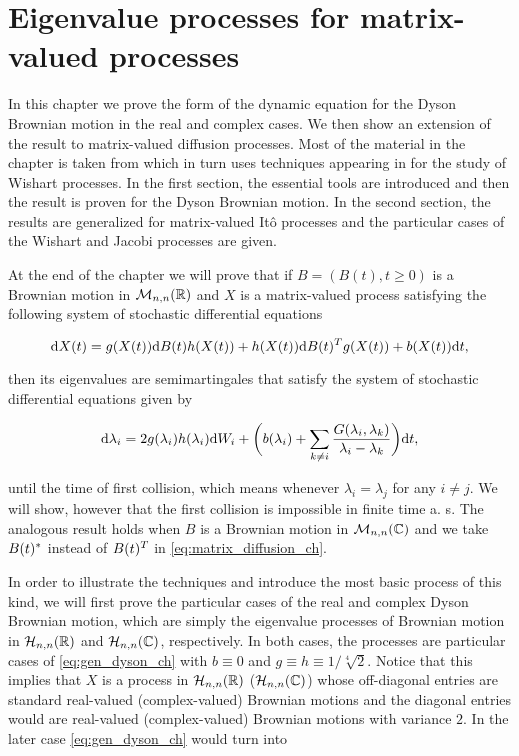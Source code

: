 \chapter{Eigenvalue processes for matrix-valued processes}  \label{ch:eigen_processes}

In this chapter we prove the form of the dynamic equation for the Dyson Brownian motion in the real and complex cases. We then show an extension of the result to matrix-valued diffusion processes. Most of the material in the chapter is taken from \cite{article:multiyamada} which in turn uses techniques appearing in \cite{bru1989diffusions} for the study of Wishart processes. In the first section, the essential tools are introduced and then the result is proven for the Dyson Brownian motion. In the second section, the results are generalized for matrix-valued Itô processes and the particular cases of the Wishart and Jacobi processes are given.

At the end of the chapter we will prove that if $B=(B(t), t\ge 0)$ is a Brownian motion in $\mathcal M_{n,n}(\mathbb R)$ and $X$ is a matrix-valued process satisfying the following system of stochastic differential equations

\begin{equation}
        \mathrm d X(t) = g(X(t)) \mathrm d B(t) h(X(t)) + h(X(t)) \mathrm d B(t)^T g(X(t)) + b(X(t))\mathrm d t, \label{eq:matrix_diffusion_ch}
\end{equation}

\noindent then its eigenvalues are semimartingales that satisfy the system of stochastic differential equations given by

    \begin{equation}
        \mathrm d \lambda_i = 2g(\lambda_i)h(\lambda_i)\mathrm d W_i + \biggl( b(\lambda_i) + \sum_{k\neq i} \frac{G(\lambda_i,\lambda_k)}{\lambda_i - \lambda_k} \biggr)\mathrm d t, \label{eq:gen_dyson_ch}
    \end{equation}

\noindent until the time of first collision, which means whenever $\lambda_i = \lambda_j$ for any $i\neq j$. We will show, however that the first collision is impossible in finite time a. s.  The analogous result holds when $B$ is a Brownian motion in $\mathcal M_{n,n}(\mathbb C)$ and we take $B(t)^*$ instead of $B(t)^T$ in \eqref{eq:matrix_diffusion_ch}.

In order to illustrate the techniques and introduce the most basic process of this kind, we will first prove the particular cases of the real and complex Dyson Brownian motion, which are simply the eigenvalue processes of Brownian motion in $\mathcal H_{n,n}(\mathbb R)$ and $\mathcal H_{n,n}(\mathbb C)$, respectively. In both cases, the processes are particular cases of \eqref{eq:gen_dyson_ch} with $b\equiv 0$ and $g \equiv h \equiv 1/\sqrt[4]{2}$. Notice that this implies that $X$ is a process in $\mathcal H_{n,n}(\mathbb R)$  ($\mathcal H_{n,n}(\mathbb C)$) whose off-diagonal entries are standard real-valued (complex-valued) Brownian motions and the diagonal entries would are real-valued (complex-valued) Brownian motions with variance $2$. In the later case \eqref{eq:gen_dyson_ch} would turn into

